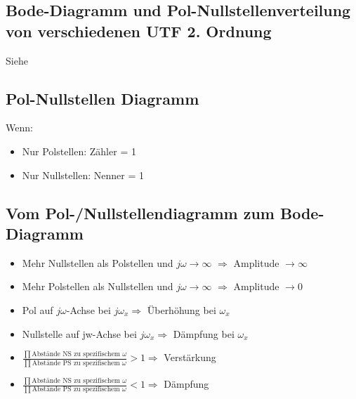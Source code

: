 \subsection{Bode-Diagramm und Pol-Nullstellenverteilung von verschiedenen UTF
2. Ordnung}
Siehe   

\subsection{Pol-Nullstellen Diagramm}
Wenn:
\begin{itemize}
\item Nur Polstellen:  Zähler = 1
\item Nur Nullstellen: Nenner = 1
\end{itemize}

\subsection{Vom Pol-/Nullstellendiagramm zum Bode-Diagramm}
\begin{itemize}
  \item Mehr Nullstellen als Polstellen und $j \omega \rightarrow\infty$
  $\Longrightarrow$ Amplitude $\rightarrow\infty$
   \item Mehr Polstellen als Nullstellen und $j \omega \rightarrow\infty$
  $\Longrightarrow$ Amplitude $\rightarrow 0$
  \item Pol auf $j \omega$-Achse bei $j\omega_x \Longrightarrow$ Überhöhung bei
  $\omega_x$
  \item Nullstelle auf jw-Achse bei $j\omega_x \Longrightarrow$ Dämpfung bei $\omega_x$
  \item $\frac{\prod{\text{Abstände NS zu spezifischem
  $\omega$}}}{\prod{\text{Abstände PS zu spezifischem
  $\omega$}}} > 1 \Longrightarrow$ Verstärkung
  \item $\frac{\prod{\text{Abstände NS zu spezifischem
  $\omega$}}}{\prod{\text{Abstände PS zu spezifischem
  $\omega$}}} < 1 \Longrightarrow$ Dämpfung
  
\end{itemize}



